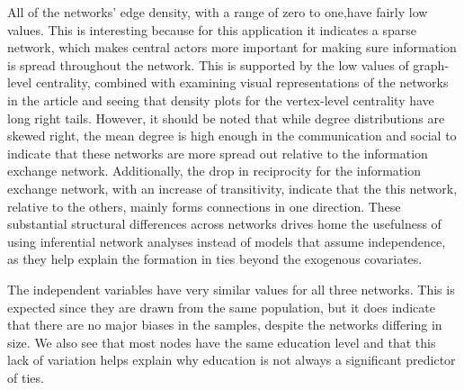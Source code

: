 \documentclass[fleqn,12pt]{wlscirep}
\begin{document}
All of the networks' edge density, with a range of zero to one,have fairly low values. This is interesting because for this application it indicates a sparse network, which makes central actors more important for making sure information is spread throughout the network. This is supported by the low values of graph-level centrality, combined with examining visual representations of the networks in the article and seeing that density plots for the vertex-level centrality have long right tails. However, it should be noted that while degree distributions are skewed right, the mean degree is high enough in the communication and social to indicate that these networks are more spread out relative to the information exchange network. Additionally, the drop in reciprocity for the information exchange network, with an increase of transitivity, indicate that the this network, relative to the others, mainly forms connections in one direction. These substantial structural differences across networks drives home the usefulness of using inferential network analyses instead of models that assume independence, as they help explain the formation in ties beyond the exogenous covariates.

The independent variables have very similar values for all three networks. This is expected since they are drawn from the same population, but it does indicate that there are no major biases in the samples, despite the networks differing in size. We also see that most nodes have the same education level and that this lack of variation helps explain why education is not always a significant predictor of ties.\\
\end{document}
